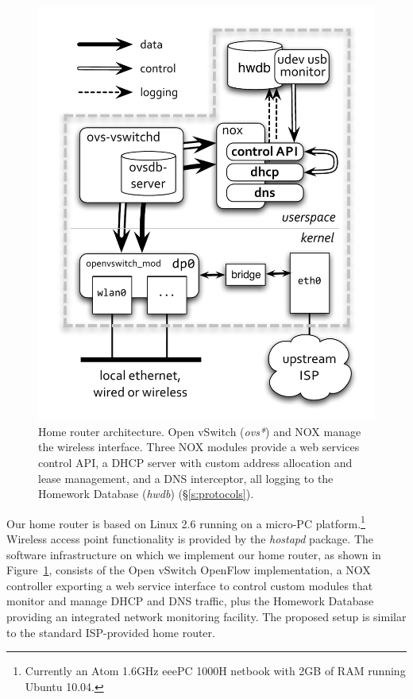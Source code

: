 \begin{figure}
\centering
\includegraphics[width=0.9\columnwidth]{architecture}
\caption{\label{f:architecture}Home router architecture.  Open vSwitch
        (\emph{ovs*}) and NOX manage the wireless interface.  Three
        NOX modules provide a web services control API, a DHCP server
        with custom address allocation and lease management, and a DNS
        interceptor, all logging to the Homework Database (\emph{hwdb})
        (\S\ref{s:protocols}). 
}\vspace{-1.5em}
\end{figure}

Our home router is based on Linux 2.6 running on a micro-PC
platform.\footnote{Currently an Atom 1.6GHz eeePC 1000H netbook with
  2GB of RAM running Ubuntu 10.04.} Wireless access point
functionality is provided by the \emph{hostapd} package.  The software
infrastructure on which we implement our home router, as shown in
Figure~\ref{f:architecture}, consists of the Open vSwitch OpenFlow
implementation, a NOX controller exporting a web service interface to
control custom modules that monitor and manage DHCP and DNS traffic,
plus the Homework
Database~\cite{sventek11:_infor_plane_archit_suppor_home_networ_manag}
providing an integrated network monitoring facility. The proposed
setup is similar to the standard ISP-provided home router.
 
